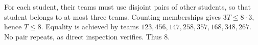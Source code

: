 For each student, their teams must use disjoint pairs of other students, so that student belongs to at most three teams. Counting memberships gives $3T\le8\cdot3$, hence $T\le8$. Equality is achieved by teams $123,456,147,258,357,168,348,267$. No pair repeats, as direct inspection verifies. Thus $\boxed8$.
